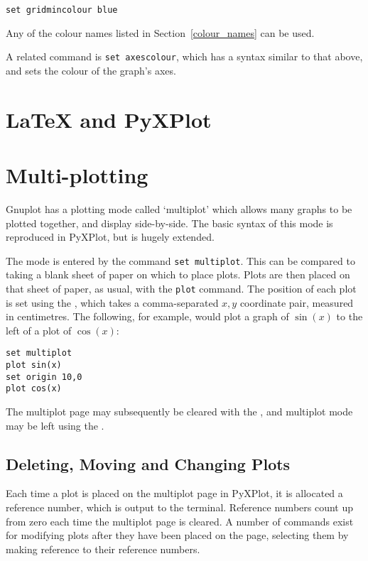 \begin{verbatim}
set gridmincolour blue
\end{verbatim}

\noindent Any of the colour names listed in Section~\ref{colour_names} can be
used.

A related command is {\tt set
axescolour}, which has a syntax similar to that above,
and sets the colour of the graph's axes.\label{set_colours}

\section{LaTeX and PyXPlot}

\section{Multi-plotting}
\label{multiplot}

Gnuplot has a plotting mode called `multiplot' which allows many graphs to be
plotted together, and display side-by-side. The basic syntax of this mode is
reproduced in PyXPlot, but is hugely extended.

The mode is entered by the command {\tt set multiplot}.
This can be compared to taking a blank sheet of paper on which to place plots.
Plots are then placed on that sheet of paper, as usual, with the {\tt plot}
command. The position of each plot is set using the , which
takes a comma-separated $x,y$ coordinate pair, measured in centimetres. The
following, for example, would plot a graph of $\sin(x)$ to the left of a plot
of $\cos(x)$:

\begin{verbatim} 
set multiplot
plot sin(x)
set origin 10,0
plot cos(x)
\end{verbatim}

The multiplot page may subsequently be cleared with the , and
multiplot mode may be left using the .

\subsection{Deleting, Moving and Changing Plots}

Each time a plot is placed on the multiplot page in PyXPlot, it is allocated a
reference number, which is output to the terminal. Reference numbers count up
from zero each time the multiplot page is cleared. A number of commands exist
for modifying plots after they have been placed on the page, selecting them by
making reference to their reference numbers.

